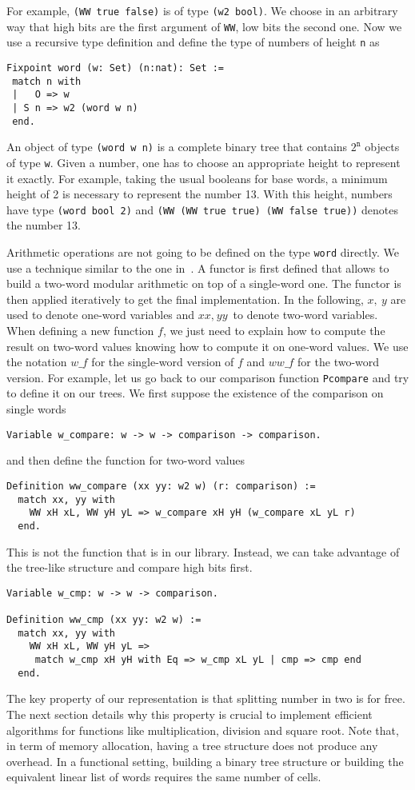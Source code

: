 For example, {\tt (WW true false)} is of type {\tt (w2 bool)}.
We choose in an arbitrary way  that high bits are the first argument of {\tt WW}, low bits
the second one. Now we use a recursive type definition and define
the type of numbers of height {\tt n} as
\begin{verbatim}
Fixpoint word (w: Set) (n:nat): Set :=
 match n with
 |   O => w
 | S n => w2 (word w n)
 end.
\end{verbatim}
An object of type {\tt (word w n)} is a complete binary tree that
contains $2^\texttt{n}$ objects of type {\tt w}. Given a number,
one has to choose an appropriate height to represent it exactly.
For example, taking the usual booleans for base words, a minimum
height of 2 is necessary to represent the number 13. With this height, 
numbers have type {\tt (word bool 2)} and 
{\tt (WW (WW true true) (WW false true))} denotes the number 13.

Arithmetic operations are not going to be defined on the type {\tt word} directly.
We use a technique similar to the one in~\cite{GreMa}. A functor is first defined that 
allows to build a two-word modular arithmetic on top of a single-word one.
The functor is then applied iteratively to get the final implementation.
In the following, $x,\ y$ are used to denote one-word variables and $\textit{xx},\ \textit{yy}$ 
to denote two-word variables. 
When defining a new function $f$, we just need to explain how to compute the 
result on two-word values knowing how to compute it on one-word values.
We use the notation $w\_f$ for the single-word version of $f$ and 
$\textit{ww}\_f$ for the two-word version.
For example, let us go back to our comparison function {\tt Pcompare}
and try to define it on our trees. We first suppose the existence
of the comparison on single words
\begin{verbatim}
Variable w_compare: w -> w -> comparison -> comparison.
\end{verbatim}
and then define the function for two-word values
\begin{verbatim}
Definition ww_compare (xx yy: w2 w) (r: comparison) :=
  match xx, yy with
    WW xH xL, WW yH yL => w_compare xH yH (w_compare xL yL r) 
  end.
\end{verbatim}
This is not the function that is in our library. Instead, we can take 
advantage of the tree-like structure and compare high bits first.  
\begin{verbatim}
Variable w_cmp: w -> w -> comparison.

Definition ww_cmp (xx yy: w2 w) :=
  match xx, yy with
    WW xH xL, WW yH yL => 
     match w_cmp xH yH with Eq => w_cmp xL yL | cmp => cmp end
  end. 
\end{verbatim}
The key property of our representation is that splitting number in two
is for free. The next section details why this property is crucial to implement efficient
algorithms for functions like multiplication, division and square root.
Note that, in term of memory allocation, having a tree structure
does not produce any overhead. In a functional setting, building a binary 
tree structure or building the equivalent linear list of words requires the same number of cells.

